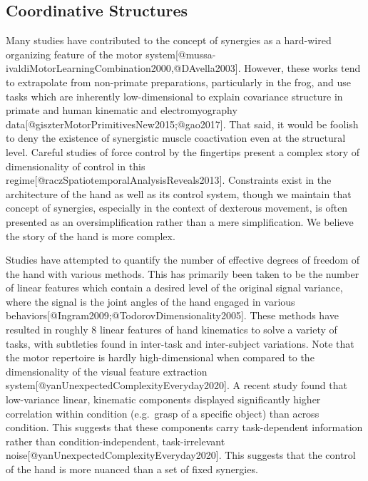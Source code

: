 \documentclass[../main.tex]{subfiles}
\begin{document}
{{{\subsection{Coordinative Structures}\label{coordinative-structures}

Many studies have contributed to the concept of synergies as a
hard-wired organizing feature of the motor
system{[}@mussa-ivaldiMotorLearningCombination2000,@DAvella2003{]}.
However, these works tend to extrapolate from non-primate preparations,
particularly in the frog, and use tasks which are inherently
low-dimensional to explain covariance structure in primate and human
kinematic and electromyography
data{[}@giszterMotorPrimitivesNew2015;@gao2017{]}. That said, it would
be foolish to deny the existence of synergistic muscle coactivation even
at the structural level. Careful studies of force control by the
fingertips present a complex story of dimensionality of control in this
regime{[}@raczSpatiotemporalAnalysisReveals2013{]}. Constraints exist in
the architecture of the hand as well as its control system, though we
maintain that concept of synergies, especially in the context of
dexterous movement, is often presented as an oversimplification rather
than a mere simplification. We believe the story of the hand is more
complex.

Studies have attempted to quantify the number of effective degrees of
freedom of the hand with various methods. This has primarily been taken
to be the number of linear features which contain a desired level of the
original signal variance, where the signal is the joint angles of the
hand engaged in various
behaviors{[}@Ingram2009;@TodorovDimensionality2005{]}. These methods
have resulted in roughly 8 linear features of hand kinematics to solve a
variety of tasks, with subtleties found in inter-task and inter-subject
variations. Note that the motor repertoire is hardly high-dimensional
when compared to the dimensionality of the visual feature extraction
system{[}@yanUnexpectedComplexityEveryday2020{]}. A recent study found
that low-variance linear, kinematic components displayed significantly
higher correlation within condition (e.g.~grasp of a specific object)
than across condition. This suggests that these components carry
task-dependent information rather than condition-independent,
task-irrelevant noise{[}@yanUnexpectedComplexityEveryday2020{]}. This
suggests that the control of the hand is more nuanced than a set of
fixed synergies.

}}}
\end{document}
